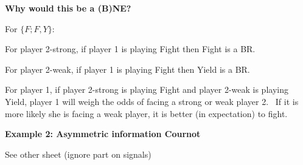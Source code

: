 \documentclass[handout]{beamer}
\begin{document}
\begin{frame}%

\textbf{Why would this be a (B)NE?}

For $\{F;F,Y\}$:

For player 2-strong, if player 1 is playing Fight then Fight is a BR.

For player 2-weak, if player 1 is playing Fight then Yield is a BR.

\bigskip

\pause%
For player 1, if player 2-strong is playing Fight and player 2-weak is
playing Yield, player 1 will weigh the odds of facing a strong or weak
player 2. \ If it is more likely she is facing a weak player, it is better
(in expectation) to fight.

\end{frame}%

\begin{frame}%

\textbf{Example 2: Asymmetric information Cournot}

See other sheet (ignore part on signals)

\end{frame}%
\end{document}
